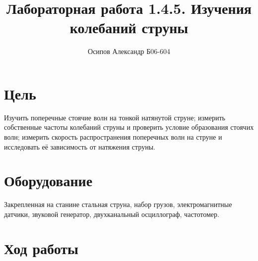 \documentclass[12pt]{extarticle}
\begin{document}
\author{Осипов Александр Б06-604}
\title{Лабораторная работа 1.4.5. Изучения колебаний струны}
\maketitle

\section{Цель}

Изучить поперечные стоячие волн на тонкой натянутой струне;
измерить собственные частоты колебаний струны и проверить условие образования
стоячих волн; измерить скорость распространения поперечных волн на струне и исследовать её зависимость от натяжения струны.

\vspace{5mm}

\section{Оборудование}

Закрепленная на станине стальная струна, набор грузов, электромагнитные датчики, звуковой генератор, двухканальный осциллограф,
частотомер.

\vspace{5mm}

\section{Ход работы}


\end{document}
